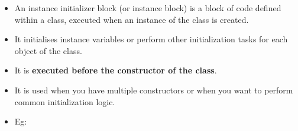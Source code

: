 \setlength{\columnsep}{3pt}
\begin{flushleft}
	
	\begin{itemize}
		\item An instance initializer block (or instance block) is a block of code defined within a class, executed when an instance of the class is created. 
		\item It initialises instance variables or perform other initialization tasks for each object of the class.
		\item It is \textbf{executed before the constructor of the class}. 
		\item It is used when you have multiple constructors or when you want to perform common initialization logic.
		\item Eg:
		\bigskip
				
	\end{itemize}	
	
	
\end{flushleft}

\newpage
